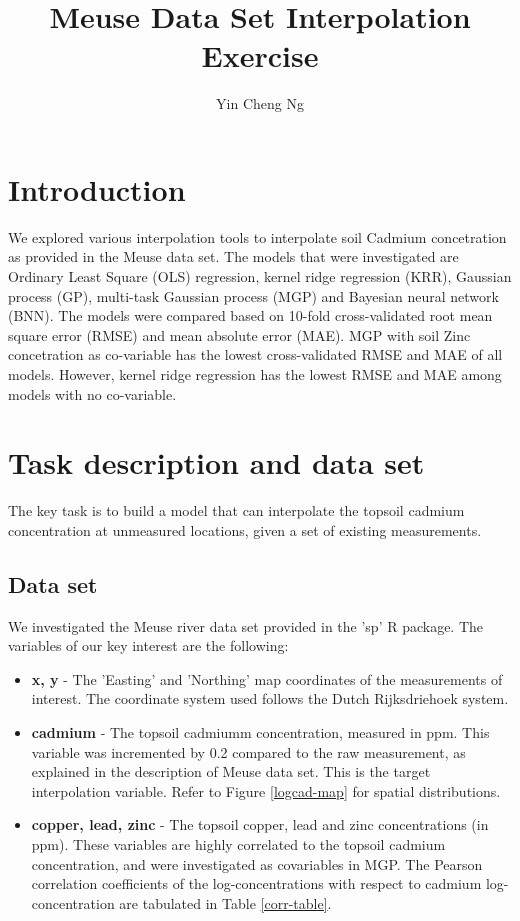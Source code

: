 \documentclass{article}
\begin{document}
\title{Meuse Data Set Interpolation Exercise}
\author{Yin Cheng Ng}

\maketitle

\section{Introduction}
We explored various interpolation tools to interpolate soil Cadmium concetration as provided in 
the Meuse data set. The models that were investigated are Ordinary Least Square (OLS) regression, 
kernel ridge regression (KRR), Gaussian process (GP), multi-task Gaussian process (MGP) and Bayesian 
neural network (BNN). The models were compared based on 10-fold cross-validated root mean square error 
(RMSE) and mean absolute error (MAE). MGP with soil Zinc concetration as co-variable has the lowest 
cross-validated RMSE and MAE of all models. However, kernel ridge regression has the lowest RMSE and MAE 
among models with no co-variable.

\section{Task description and data set}
The key task is to build a model that can interpolate the topsoil cadmium concentration at unmeasured 
locations, given a set of existing measurements.
\subsection{Data set}
We investigated the Meuse river data set provided in the 'sp' R package. The variables of our key interest 
are the following:
\begin{itemize}
	\item \textbf{x, y} - The 'Easting' and 'Northing' map coordinates of the measurements of 
		interest. The coordinate system used follows the Dutch Rijksdriehoek system.
	\item \textbf{cadmium} - The topsoil cadmiumm concentration, measured in ppm. This variable 
		was incremented by 0.2 compared to the raw measurement, as explained in the description 
		of Meuse data set. This is the target interpolation variable. 
		Refer to Figure \ref{logcad-map} for spatial distributions.
	\item \textbf{copper, lead, zinc} - The topsoil copper, lead and zinc concentrations (in ppm).
		These variables are highly correlated to the topsoil cadmium concentration, and were 
		investigated as covariables in MGP. The Pearson correlation coefficients of the 
		log-concentrations with respect to cadmium log-concentration are tabulated in 
		Table \ref{corr-table}.
\end{itemize}
\end{document}
